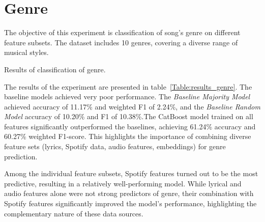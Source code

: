 \section{Genre}
\label{sec:genre}

The objective of this experiment is classification of song's genre on different
feature subsets. The dataset includes 10 genres, covering a diverse range of
musical styles.

\begin{table}[H]
\centering
\caption{Results of classification of genre.}
\label{Table:results_genre}
\end{table}

The results of the experiment are presented in table~\ref{Table:results_genre}. The baseline models achieved very poor
performance. The \textit{Baseline Majority Model} achieved accuracy of 11.17\%
and weighted F1 of 2.24\%, and the \textit{Baseline Random Model} accuracy of
10.20\% and F1 of 10.38\%.The CatBoost model trained on all features
significantly outperformed the baselines, achieving 61.24\% accuracy and
60.27\% weighted F1-score. This highlights the importance of combining diverse
feature sets (lyrics, Spotify data, audio features, embeddings) for genre
prediction.

Among the individual feature subsets, Spotify features turned out to be the
most predictive, resulting in a relatively well-performing model. While lyrical
and audio features alone were not strong predictors of genre, their combination
with Spotify features significantly improved the model's performance,
highlighting the complementary nature of these data sources.





